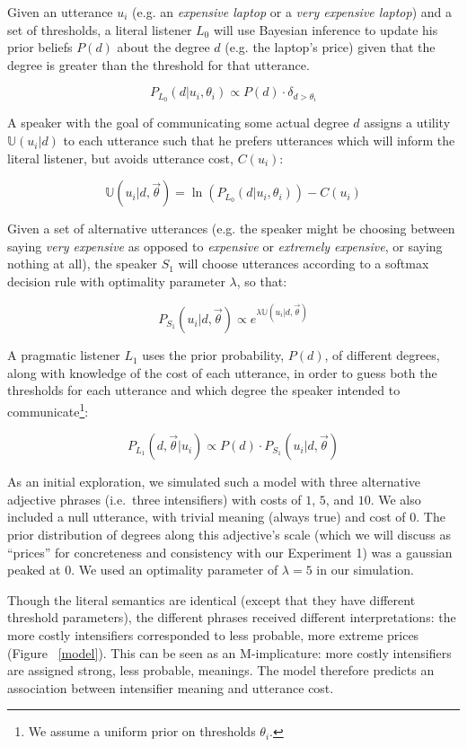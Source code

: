 \documentclass[10pt,letterpaper]{article}
\newcommand{\w}[1]{\emph{#1}}
\begin{document}
Given an utterance $u_i$ (e.g. an \w{expensive laptop} or a \w{very expensive laptop}) and a set of thresholds, a literal listener $L_0$ will use Bayesian inference to update his prior beliefs $P(d)$ about the degree $d$ (e.g. the laptop's price) given that the degree is greater than the threshold for that utterance.

$$P_{L_0}(d|u_i, \theta_i) \propto P(d) \cdot \delta_{d > \theta_i}$$

A speaker with the goal of communicating some actual degree $d$ assigns a utility $\mathbb{U}(u_i|d)$ to each utterance such that he prefers utterances which will inform the literal listener, but avoids utterance cost, $C(u_i)$:

$$\mathbb{U}(u_i | d, \vec{\theta}) =  \ln\left(P_{L_0}(d | u_i, \theta_i) \right) - C(u_i) $$

Given a set of alternative utterances (e.g. the speaker might be choosing between saying \w{very expensive} as opposed to \w{expensive} or \w{extremely expensive}, or saying nothing at all), the speaker $S_1$ will choose utterances according to a softmax decision rule \cite{sutton} with optimality parameter $\lambda$, so that:

$$ P_{S_1}(u_i | d, \vec{\theta}) \propto e^{\lambda \mathbb{U}(u_i | d, \vec{\theta})} $$

A pragmatic listener $L_1$ uses the prior probability, $P(d)$, of different degrees, along with knowledge of the cost of each utterance, in order to guess both the thresholds for each utterance and which degree the speaker intended to communicate\footnote{We assume a uniform prior on thresholds $\theta_i$.}:

$$ P_{L_1}(d, \vec{\theta} | u_i) \propto P(d) \cdot P_{S_1}(u_i | d, \vec{\theta}) $$

As an initial exploration, we simulated such a model with three alternative adjective phrases (i.e.~three intensifiers) with costs of $1$, $5$, and $10$. We also included a null utterance, with trivial meaning (always true) and cost of $0$. The prior distribution of degrees along this adjective's scale (which we will discuss as ``prices'' for concreteness and consistency with our Experiment 1) was a gaussian peaked at $0$.
We used an optimality parameter of $\lambda=5$ in our simulation. 

Though the literal semantics are identical (except that they have different threshold parameters), the different phrases received different interpretations: the more costly intensifiers corresponded to less probable, more extreme prices (Figure ~\ref{model}). This can be seen as an M-implicature: more costly intensifiers are assigned strong, less probable, meanings. 
The model therefore predicts an association between intensifier meaning and utterance cost.
\end{document}
